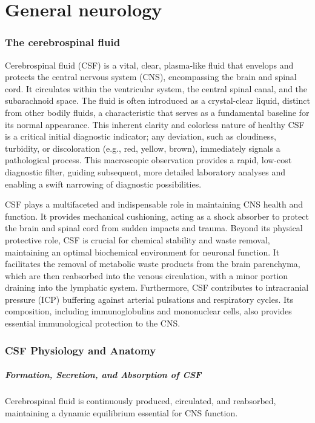 \chapter{General neurology}

\subsection{The cerebrospinal fluid}
	
Cerebrospinal fluid (CSF) is a vital, clear, plasma-like fluid that envelops and protects the central nervous system (CNS), encompassing the brain and spinal cord. It circulates within the ventricular system, the central spinal canal, and the subarachnoid space. The fluid is often introduced as a crystal-clear liquid, distinct from other bodily fluids, a characteristic that serves as a fundamental baseline for its normal appearance. This inherent clarity and colorless nature of healthy CSF is a critical initial diagnostic indicator; any deviation, such as cloudiness, turbidity, or discoloration (e.g., red, yellow, brown), immediately signals a pathological process. This macroscopic observation provides a rapid, low-cost diagnostic filter, guiding subsequent, more detailed laboratory analyses and enabling a swift narrowing of diagnostic possibilities.
	
CSF plays a multifaceted and indispensable role in maintaining CNS health and function. It provides mechanical cushioning, acting as a shock absorber to protect the brain and spinal cord from sudden impacts and trauma. Beyond its physical protective role, CSF is crucial for chemical stability and waste removal, maintaining an optimal biochemical environment for neuronal function. It facilitates the removal of metabolic waste products from the brain parenchyma, which are then reabsorbed into the venous circulation, with a minor portion draining into the lymphatic system. Furthermore, CSF contributes to intracranial pressure (ICP) buffering against arterial pulsations and respiratory cycles. Its composition, including immunoglobulins and mononuclear cells, also provides essential immunological protection to the CNS.

\subsection{CSF Physiology and Anatomy}
	
\paragraph{Formation, Secretion, and Absorption of CSF} Cerebrospinal fluid is continuously produced, circulated, and reabsorbed, maintaining a dynamic equilibrium essential for CNS function.
	
